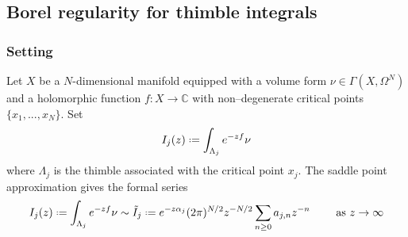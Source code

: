 \documentclass{article}
\let\Re\relax
\DeclareMathOperator{\Re}{Re}
\theoremstyle{definition}
\newcommand{\C}{\mathbb{C}}
\newcommand*{\defeq}{\mathrel{\vcenter{\baselineskip0.5ex \lineskiplimit0pt
                     \hbox{\scriptsize.}\hbox{\scriptsize.}}}%
                     =}
\newcommand{\borel}{\mathcal{B}}
\theoremstyle{plain}
\begin{document}




\subsection{Borel regularity for thimble integrals}\label{borel-reg-thimble}

\subsubsection{Setting}

Let $X$ be a $N$-dimensional manifold equipped with a volume form $\nu\in\Gamma(X,\Omega^N)$ and a holomorphic function $f\colon X\to\C$ with non--degenerate critical points $\{x_1,...,x_N\}$. Set
\begin{equation}\label{exp-int}
I_j(z)\defeq\int_{\Lambda_j}e^{-zf}\nu
\end{equation}
where $\Lambda_j$ is the thimble associated with the critical point $x_j$.  
The saddle point approximation gives the formal series 
\begin{equation}
{I}_{j}(z)\defeq\int_{\Lambda_j}e^{-zf}\nu\sim \tilde{I}_{j}\defeq e^{-z\alpha_j}(2\pi)^{N/2} z^{-N/2}\sum_{n\geq 0}a_{j,n}z^{-n} \qquad \text{ as } \Re z\to\infty
\end{equation}
\end{document}
